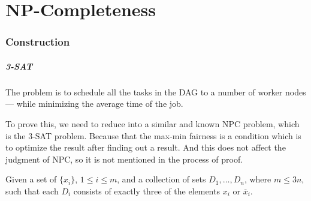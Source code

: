 \part{NP-Completeness}
\section{Construction}
\begin{frame}
\frametitle{\textsc{3-SAT}}
    The problem is to schedule all the tasks in the DAG to a number of worker nodes --- while minimizing the average time of the job.
    
    To prove this, we need to reduce into a similar and known NPC problem, which is the 3-SAT problem. Because that the max-min fairness is a condition which is to optimize the result after finding out a result. And this does not affect the judgment of NPC, so it is not mentioned in the process of proof.

    \begin{definition}
    Given a set of $\{x_i\}$, $1 \leq i \leq m$, and a collection of sets $D_1,\ldots,D_n$, where $m \leq 3n$, such that each $D_i$ consists of exactly three of the elements $x_i$ or $\overline x_i$.
    \end{definition}
\end{frame}

